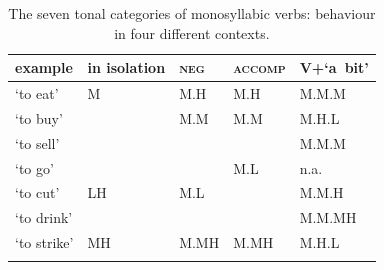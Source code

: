 \begin{table}[h!!]
\caption{The seven tonal categories of {monosyllabic} verbs: behaviour in four different contexts.}
\label{tab:thelexicaltonesofverbs}
{\renewcommand{\arraystretch}{1.20}
\begin{tabularx}{\textwidth} { P{25mm} P{20mm} Q Q  P{20mm} }
\lsptoprule
	 example & in isolation & \textsc{neg} & \textsc{accomp} & V+‘a~bit’\\ \midrule
	   ‘to eat’ & M & M.H & M.H & \lshadedcell M.M.M\\ 
	  ‘to buy’ &   & M.M & M.M & \shadedcell M.H.L\\
	  ‘to sell’ &  & \hspace*{\fill} & \hspace*{\fill} & \lshadedcell M.M.M\\
	  ‘to go’ & \hspace*{\fill} & \hspace*{\fill} & M.L & n.a.\\ 
	 ‘to cut’ & LH & M.L & \hspace*{\fill} & M.M.H\\
	 ‘to drink’ & \hspace*{\fill} & \hspace*{\fill} & \hspace*{\fill} & M.M.MH\\ 
	 ‘to strike’ & MH & M.MH & M.MH & \shadedcell M.H.L\\
\lspbottomrule
\end{tabularx}}
\end{table}


